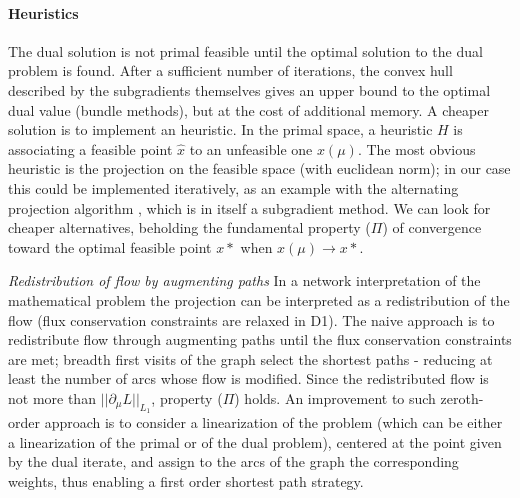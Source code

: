 \documentclass[10pt,twoside,book,a5paper]{ncc}
\begin{document}
\paragraph{Heuristics}
The dual solution is not primal feasible until the optimal solution to the dual problem is found. After a sufficient number of iterations, the convex hull described by the subgradients themselves gives an upper bound to the optimal dual value (bundle methods), but at the cost of additional memory. A cheaper solution is to implement an heuristic.
In the primal space, a heuristic $H$ is associating a feasible point $\hat{x}$ to an unfeasible one $x(\mu)$. The most obvious heuristic is the projection on the feasible space (with euclidean norm); in our case this could be implemented iteratively, as an example with the alternating projection algorithm \cite{NotesBoyd}, which is in itself a subgradient method. We can look for cheaper alternatives, beholding the fundamental property ($\Pi$) of convergence toward the optimal feasible point $x*$ when $x(\mu) \longrightarrow x*$.

\emph{Redistribution of flow by augmenting paths} In a network interpretation of the mathematical problem the projection can be interpreted as a redistribution of the flow (flux conservation constraints are relaxed in D1). The naive approach is to redistribute flow through augmenting paths until the flux conservation constraints are met; breadth first visits of the graph select the shortest paths - reducing at least the number of arcs whose flow is modified. Since the redistributed flow is not more than $||\partial_{\mu}L||_{L_1}$, property ($\Pi$) holds. An improvement to such zeroth-order approach is to consider a linearization of the problem (which can be either a linearization of the primal or of the dual problem), centered at the point given by the dual iterate, and assign to the arcs of the graph the corresponding weights, thus enabling a first order shortest path strategy.
\end{document}
